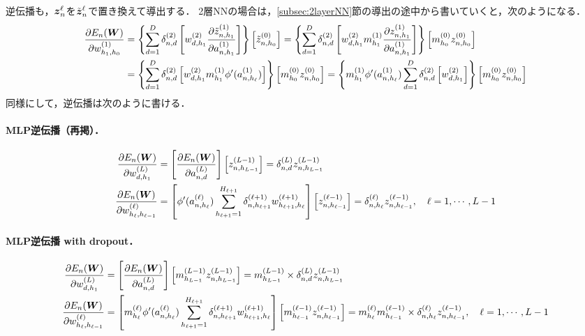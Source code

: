 逆伝播も，$\mbox{\boldmath $z$}_n^{\ell}$を$\tilde{\mbox{\boldmath $z$}}_n^{\ell}$で置き換えて導出する．
2層NNの場合は，\ref{subsec:2layerNN}節の導出の途中から書いていくと，次のようになる．
\begin{align*}
\frac{\partial E_n(\mbox{\boldmath $W$})}{\partial w^{(1)}_{h_1,h_0}}
&=
\left\{
\sum_{d=1}^D\delta^{(2)}_{n,d}
\left[ w^{(2)}_{d,h_1} \frac{\partial \tilde{z}^{(1)}_{n,h_1}}{\partial a^{(1)}_{n,h_1}} \right]
\right\}
\left[\tilde{z}^{(0)}_{n,h_0}\right]
=
\left\{
\sum_{d=1}^D\delta^{(2)}_{n,d}
\left[ w^{(2)}_{d,h_1} m_{h_1}^{(1)}\frac{\partial z^{(1)}_{n,h_1} } {\partial a^{(1)}_{n,h_1}} \right]
\right\}
\left[m_{h_0}^{(0)}z^{(0)}_{n,h_0}\right]
\\
&=
\left\{
\sum_{d=1}^D\delta^{(2)}_{n,d}
\left[ w^{(2)}_{d,h_1} m_{h_1}^{(1)} \phi'(a^{(1)}_{n,h_\ell}) \right]
\right\}
\left[m_{h_0}^{(0)}z^{(0)}_{n,h_0}\right]
=
\left\{
m_{h_1}^{(1)} \phi'(a^{(1)}_{n,h_\ell})
\sum_{d=1}^D\delta^{(2)}_{n,d}
\left[ w^{(2)}_{d,h_1} \right]
\right\}
\left[m_{h_0}^{(0)}z^{(0)}_{n,h_0}\right]
\end{align*}
同様にして，逆伝播は次のように書ける．
\paragraph{MLP逆伝播（再掲）．}
\begin{align*}
 \frac{\partial E_n(\mbox{\boldmath $W$})}{\partial w^{(L)}_{d,h_1}}
 &=
 \left[ \frac{\partial E_n(\mbox{\boldmath $W$})}{\partial a^{(L)}_{n,d}} \right] \left[ z^{(L-1)}_{n,h_{L-1}}\right]
=\delta^{(L)}_{n,d}z^{(L-1)}_{n,h_{L-1}}
\\
\frac{\partial E_n(\mbox{\boldmath $W$})}{\partial w^{(\ell)}_{h_\ell,h_{\ell-1}}}
&=
\left[
\phi'(a^{(\ell)}_{n,h_\ell}) \sum_{h_{\ell+1}=1}^{H_{\ell+1}}\delta^{(\ell+1)}_{n,h_{\ell+1}} w^{(\ell+1)}_{h_{\ell+1},h_\ell}
\right]
\left[z^{(\ell-1)}_{n,h_{\ell-1}}\right]
=
\delta^{(\ell)}_{n,h_\ell}
z^{(\ell-1)}_{n,h_{\ell-1}}
,~~~\ell=1,\cdots,L-1
\end{align*}

\paragraph{MLP逆伝播 with dropout．}
\begin{align*}
 \frac{\partial E_n(\mbox{\boldmath $W$})}{\partial w^{(L)}_{d,h_1}}
 &=
 \left[ \frac{\partial E_n(\mbox{\boldmath $W$})}{\partial a^{(L)}_{n,d}} \right] \left[ m^{(L-1)}_{h_{L-1}} z^{(L-1)}_{n,h_{L-1}}\right]
=m^{(L-1)}_{h_{L-1}} \times \delta^{(L)}_{n,d}z^{(L-1)}_{n,h_{L-1}}
\\
\frac{\partial E_n(\mbox{\boldmath $W$})}{\partial w^{(\ell)}_{h_\ell,h_{\ell-1}}}
&=
\left[
m^{(\ell)}_{h_{\ell}} \phi'(a^{(\ell)}_{n,h_\ell}) \sum_{h_{\ell+1}=1}^{H_{\ell+1}}\delta^{(\ell+1)}_{n,h_{\ell+1}} w^{(\ell+1)}_{h_{\ell+1},h_\ell}
\right]
\left[m^{(\ell-1)}_{h_{\ell-1}} z^{(\ell-1)}_{n,h_{\ell-1}}\right]
=
m^{(\ell)}_{h_{\ell}}m^{(\ell-1)}_{h_{\ell-1}}\times
\delta^{(\ell)}_{n,h_\ell}
z^{(\ell-1)}_{n,h_{\ell-1}}
,~~~\ell=1,\cdots,L-1
\end{align*}


